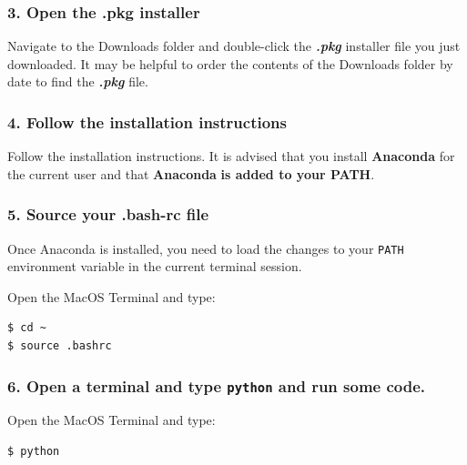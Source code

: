 \documentclass{book}
\begin{document}
    
        \subsubsection{3. Open the .pkg
installer}\label{open-the-.pkg-installer}

Navigate to the Downloads folder and double-click the
\textbf{\emph{.pkg}} installer file you just downloaded. It may be
helpful to order the contents of the Downloads folder by date to find
the \textbf{\emph{.pkg}} file.
    




    
        \subsubsection{4. Follow the installation
instructions}\label{follow-the-installation-instructions}

Follow the installation instructions. It is advised that you install
\textbf{Anaconda} for the current user and that \textbf{Anaconda}
\textbf{is added to your PATH}.
    




    
        \subsubsection{5. Source your .bash-rc
file}\label{source-your-.bash-rc-file}

Once Anaconda is installed, you need to load the changes to your
\lstinline!PATH! environment variable in the current terminal session.

Open the MacOS Terminal and type:

\begin{lstlisting}
$ cd ~
$ source .bashrc
\end{lstlisting}
    




    
        \subsubsection{\texorpdfstring{6. Open a terminal and type
\texttt{python} and run some
code.}{6. Open a terminal and type python and run some code.}}\label{open-a-terminal-and-type-python-and-run-some-code.}

Open the MacOS Terminal and type:

\begin{lstlisting}
$ python
\end{lstlisting}
\end{document}
